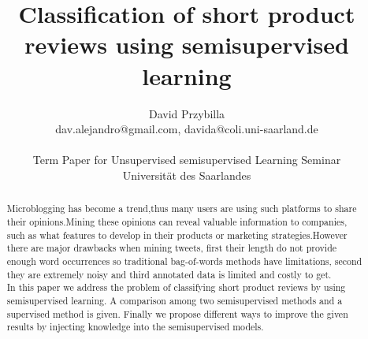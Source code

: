 \documentclass[4pt,a4paper,twocolumn]{article}
\author{David Przybilla\\dav.alejandro@gmail.com, davida@coli.uni-saarland.de\\ \\ Term Paper for Unsupervised semisupervised
Learning Seminar\\ Universit\"{a}t des Saarlandes}
\title{Classification of short product reviews using semisupervised learning}
\begin{document}
\twocolumn[
	 \begin{@twocolumnfalse}
    \maketitle
  \end{@twocolumnfalse}
 ]

   \begin{abstract}
      Microblogging has become a trend,thus many users are using such platforms to share their opinions.Mining these opinions can reveal valuable information to companies, such as what features to develop in their products or marketing strategies.However there are  major drawbacks when mining tweets, first their length do not provide enough word occurrences so traditional bag-of-words methods have limitations, second they are extremely noisy and third annotated data is limited and costly to get.\\
      In this paper we address the problem of classifying short product reviews by using semisupervised learning. A comparison among two semisupervised methods and a supervised method is given. Finally we propose different ways to improve the given results by injecting knowledge into the semisupervised models.
    \end{abstract}
\end{document}
